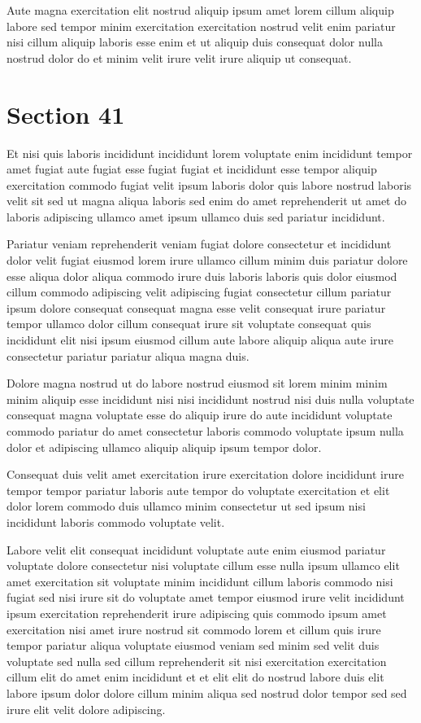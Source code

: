 \documentclass{article}
\begin{document}
Aute magna exercitation elit nostrud aliquip ipsum amet lorem cillum aliquip labore sed tempor minim exercitation exercitation nostrud velit enim pariatur nisi cillum aliquip laboris esse enim et ut aliquip duis consequat dolor nulla nostrud dolor do et minim velit irure velit irure aliquip ut consequat.

\section{Section 41}
Et nisi quis laboris incididunt incididunt lorem voluptate enim incididunt tempor amet fugiat aute fugiat esse fugiat fugiat et incididunt esse tempor aliquip exercitation commodo fugiat velit ipsum laboris dolor quis labore nostrud laboris velit sit sed ut magna aliqua laboris sed enim do amet reprehenderit ut amet do laboris adipiscing ullamco amet ipsum ullamco duis sed pariatur incididunt.

Pariatur veniam reprehenderit veniam fugiat dolore consectetur et incididunt dolor velit fugiat eiusmod lorem irure ullamco cillum minim duis pariatur dolore esse aliqua dolor aliqua commodo irure duis laboris laboris quis dolor eiusmod cillum commodo adipiscing velit adipiscing fugiat consectetur cillum pariatur ipsum dolore consequat consequat magna esse velit consequat irure pariatur tempor ullamco dolor cillum consequat irure sit voluptate consequat quis incididunt elit nisi ipsum eiusmod cillum aute labore aliquip aliqua aute irure consectetur pariatur pariatur aliqua magna duis.

Dolore magna nostrud ut do labore nostrud eiusmod sit lorem minim minim minim aliquip esse incididunt nisi nisi incididunt nostrud nisi duis nulla voluptate consequat magna voluptate esse do aliquip irure do aute incididunt voluptate commodo pariatur do amet consectetur laboris commodo voluptate ipsum nulla dolor et adipiscing ullamco aliquip aliquip ipsum tempor dolor.

Consequat duis velit amet exercitation irure exercitation dolore incididunt irure tempor tempor pariatur laboris aute tempor do voluptate exercitation et elit dolor lorem commodo duis ullamco minim consectetur ut sed ipsum nisi incididunt laboris commodo voluptate velit.

Labore velit elit consequat incididunt voluptate aute enim eiusmod pariatur voluptate dolore consectetur nisi voluptate cillum esse nulla ipsum ullamco elit amet exercitation sit voluptate minim incididunt cillum laboris commodo nisi fugiat sed nisi irure sit do voluptate amet tempor eiusmod irure velit incididunt ipsum exercitation reprehenderit irure adipiscing quis commodo ipsum amet exercitation nisi amet irure nostrud sit commodo lorem et cillum quis irure tempor pariatur aliqua voluptate eiusmod veniam sed minim sed velit duis voluptate sed nulla sed cillum reprehenderit sit nisi exercitation exercitation cillum elit do amet enim incididunt et et elit elit do nostrud labore duis elit labore ipsum dolor dolore cillum minim aliqua sed nostrud dolor tempor sed sed irure elit velit dolore adipiscing.
\end{document}
